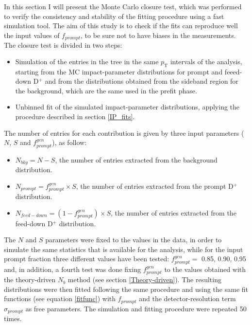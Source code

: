 \documentclass[b5paper,10pt,twoside,oldstyle,classica]{toptesi}
\newcommand{\pt}{p_\text{T}}
\begin{document}
In this section I will present the Monte Carlo closure test, which was performed to verify the consistency and stability of the fitting procedure using a fast simulation tool. The aim of this study is to check if the fits can reproduce well the input values of $f_{prompt}$, to be sure not to have biases in the measurements. The closure test is divided in two steps:
\begin{itemize}
 \item Simulation of the entries in the tree in the same $\pt$ intervals of the analysis, starting from the MC impact-parameter distributions for prompt and feeed-down D$^+$ and from the distributions obtained from the sideband region for the background, which are the same used in the prefit phase.
 \item Unbinned fit of the simulated impact-parameter distributions, applying the procedure described in section \ref{IP_fits}. 
\end{itemize}
The number of entries for each contribution is given by three input parameters ($N$, $S$ and $f_{prompt}^{gen}$), as follow: 
\begin{itemize}
 \item $N_{bkg} = N-S$, the number of entries extracted from the background distribution.
 \item $N_{prompt} = f_{prompt}^{gen}\times S$, the number of entries extracted from the prompt D$^+$ distribution.
 \item $N_{feed-down} = (1-f_{prompt}^{gen})\times S$, the number of entries extracted from the feed-down D$^+$ distribution.
\end{itemize}
The $N$ and $S$ parameters were fixed to the values in the data, in order to simulate the same statistics that is available for the analysis, while for the input prompt fraction three different values have been tested: $f_{prompt}^{gen}=$ 0.85, 0.90, 0.95 and, in addition, a fourth test was done fixing $f_{prompt}^{gen}$ to the values obtained with the theory-driven $N_{b}$ method (see section \ref{Theory-driven}).   
The resulting distributions were then fitted following the same procedure and using the same fit functions (see equation \ref{fitfunc}) with $f_{prompt}$ and the detector-resolution term $\sigma_{prompt}$ as free parameters. The simulation and fitting procedure were repeated 50 times. 
\end{document}
